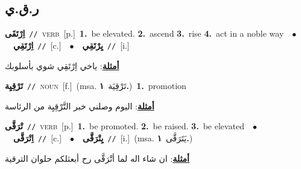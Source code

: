 \documentclass[10pt,a4paper,twoside]{article} %
\begin{document}
\begin{multicols}{2}
\vspace{-3mm}
\subsection*{\color{blue}\foreignlanguage{arabic}{ر.ق.ي}\color{blue}{}} 

{\setlength\topsep{0pt}\textbf{\foreignlanguage{arabic}{اِرْتَقَى}}\ {\color{gray}\texttt{//}\color{black}}\ \textsc{verb}\ [p.]\ \textbf{1.}~be elevated.  \textbf{2.}~ascend  \textbf{3.}~rise  \textbf{4.}~act in a noble way\ \ $\bullet$\ \ \setlength\topsep{0pt}\textbf{\foreignlanguage{arabic}{اِرْتَقِي}}\ {\color{gray}\texttt{//}\color{black}}\ [c.]\ \ $\bullet$\ \ \setlength\topsep{0pt}\textbf{\foreignlanguage{arabic}{يِرْتَقِي}}\ {\color{gray}\texttt{//}\color{black}}\ [i.]\  \begin{flushright}\color{gray}\foreignlanguage{arabic}{\textbf{\underline{\foreignlanguage{arabic}{أمثلة}}}: ياخي اِرْتَقِي شوي بأسلوبك}\end{flushright}\color{black}} \vspace{2mm}

{\setlength\topsep{0pt}\textbf{\foreignlanguage{arabic}{تَرْقِيِة}}\ {\color{gray}\texttt{//}\color{black}}\ \textsc{noun}\ [f.]\ \color{gray}(msa. \foreignlanguage{arabic}{تَرْقِيَة}~\foreignlanguage{arabic}{\textbf{١.}})\color{black}\ \textbf{1.}~promotion\  \begin{flushright}\color{gray}\foreignlanguage{arabic}{\textbf{\underline{\foreignlanguage{arabic}{أمثلة}}}: اليوم وصلني خبر التَّرْقِيِة من الرئاسة}\end{flushright}\color{black}} \vspace{2mm}

{\setlength\topsep{0pt}\textbf{\foreignlanguage{arabic}{تْرَقَّى}}\ {\color{gray}\texttt{//}\color{black}}\ \textsc{verb}\ [p.]\ \textbf{1.}~be promoted.  \textbf{2.}~be raised.  \textbf{3.}~be elevated\ \ $\bullet$\ \ \setlength\topsep{0pt}\textbf{\foreignlanguage{arabic}{اِتْرَقَّى}}\ {\color{gray}\texttt{//}\color{black}}\ [c.]\ \ $\bullet$\ \ \setlength\topsep{0pt}\textbf{\foreignlanguage{arabic}{يِتْرَقَّى}}\ {\color{gray}\texttt{//}\color{black}}\ [i.]\ \color{gray}(msa. \foreignlanguage{arabic}{يَتَرَقَّى}~\foreignlanguage{arabic}{\textbf{١.}})\color{black}\  \begin{flushright}\color{gray}\foreignlanguage{arabic}{\textbf{\underline{\foreignlanguage{arabic}{أمثلة}}}: ان شاء اله لما أتْرَقَّى رح أبعثلكم حلوان الترقية}\end{flushright}\color{black}} \vspace{2mm}


\end{multicols}
\end{document}
